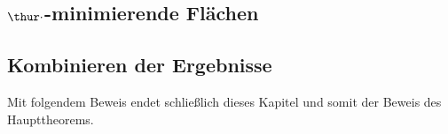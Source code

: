 
    


\subsection{$\thur \cdot$-minimierende Flächen}
    
\subsection{Kombinieren der Ergebnisse}
    
Mit folgendem Beweis endet schließlich dieses Kapitel und somit der Beweis des Haupttheorems.

